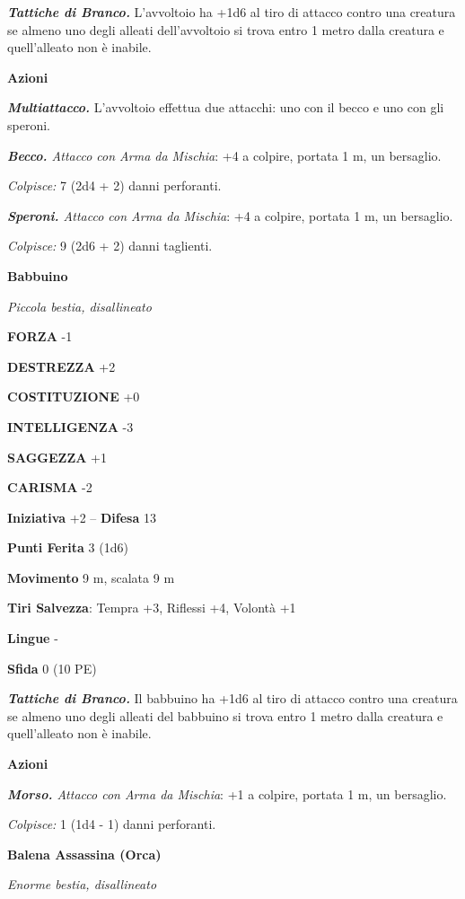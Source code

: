 \begin{multicols}{2}
\emph{\textbf{Tattiche di Branco.}} L'avvoltoio ha +1d6 al tiro di attacco contro una creatura se almeno uno degli alleati dell'avvoltoio si trova entro 1 metro dalla creatura e quell'alleato non è inabile.

\textbf{Azioni}

\emph{\textbf{Multiattacco.}} L'avvoltoio effettua due attacchi: uno con il becco e uno con gli speroni.

\emph{\textbf{Becco.} Attacco con Arma da Mischia}: +4 a colpire, portata 1 m, un bersaglio.

\emph{Colpisce:} 7 (2d4 + 2) danni perforanti.

\emph{\textbf{Speroni.} Attacco con Arma da Mischia}: +4 a colpire, portata 1 m, un bersaglio.

\emph{Colpisce:} 9 (2d6 + 2) danni taglienti.

\medskip\textbf{Babbuino}

\emph{Piccola bestia, disallineato}

\textbf{FORZA} -1

\textbf{DESTREZZA} +2

\textbf{COSTITUZIONE} +0

\textbf{INTELLIGENZA} -3

\textbf{SAGGEZZA} +1

\textbf{CARISMA} -2

\textbf{Iniziativa} +2 -- \textbf{Difesa} 13

\textbf{Punti Ferita} 3 (1d6)

\textbf{Movimento} 9 m, scalata 9 m

\textbf{Tiri Salvezza}: Tempra +3, Riflessi +4, Volontà +1

\textbf{Lingue} -

\textbf{Sfida} 0 (10 PE)

\emph{\textbf{Tattiche di Branco.}} Il babbuino ha +1d6 al tiro di attacco contro una creatura se almeno uno degli alleati del babbuino si trova entro 1 metro dalla creatura e quell'alleato non è inabile.

\textbf{Azioni}

\emph{\textbf{Morso.} Attacco con Arma da Mischia}: +1 a colpire, portata 1 m, un bersaglio.

\emph{Colpisce:} 1 (1d4 - 1) danni perforanti.


\medskip\textbf{Balena Assassina (Orca)}

\emph{Enorme bestia, disallineato}


\end{multicols}
